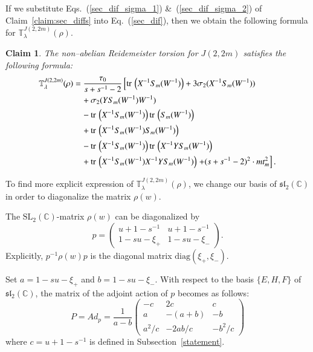 \documentclass[a4paper]{amsart}
\theoremstyle{plain}
\newtheorem{claim}[theorem]{Claim}
\theoremstyle{definition}
\theoremstyle{remark}
\newcommand{\C}{{\mathbb C}}
\newcommand{\CC}{{\mathbb C}}
\newcommand{\SL}{{\mathrm{SL}_2(\C)}}
\newcommand{\sll}{\mathfrak{sl}_2(\CC)}
\newcommand{\trace}{{\rm tr}\,}
\begin{document}
If we substitute Eqs.~(\ref{sec_dif_sigma_1}) \&~(\ref{sec_dif_sigma_2}) of Claim~\ref{claim:sec_diffs}
into Eq.~(\ref{sec_dif}), then we obtain the following formula for ${\mathbb T}^{J(2, 2m)}_{\lambda} (\rho)$.


\begin{claim}\label{torsionJ(2,2m)}
The non--abelian Reidemeister torsion for $J(2, 2m)$ satisfies the following formula:
\begin{align} \label{matrix_rep_torsion_J(2,2m)}
{\mathbb T}^{J(2, 2m)}_{\lambda} (\rho)
&=
\frac{\tau_0}{s+s^{-1}-2}
\left[
    \trace\left(X^{-1}S_m(W^{-1})\right)
    +3\sigma_2(X^{-1}S_m(W^{-1})) \right. \\
    &\quad + \sigma_2(YS_m(W^{-1})W^{-1}) \nonumber \\ 
    &\quad -\trace\left(X^{-1}S_m(W^{-1})\right)\trace\left( S_m(W^{-1})\right) \nonumber \\
    &\quad + \trace\left(X^{-1}S_m(W^{-1})S_m(W^{-1})\right) \nonumber \\
 &\quad- \trace\left(X^{-1}S_m(W^{-1})\right)\trace\left( X^{-1}YS_m(W^{-1}) \right) \nonumber \\
 &\quad + \trace\left(X^{-1}S_m(W^{-1}) X^{-1}YS_m(W^{-1})\right)  
 \left.+ (s+s^{-1} - 2)^2 \cdot mt_m^2 \right]. \nonumber
\end{align}
\end{claim}

To find more explicit expression of ${\mathbb T}^{J(2, 2m)}_{\lambda}(\rho)$,
we change our basis of $\sll$ in order to diagonalize the matrix {$\rho(w)$}.

The $\SL$-matrix $\rho(w)$ can be diagonalized by 
\[
p=
\left(
\begin{array}{cc}
u+1-s^{-1} & u+1-s^{-1} \\
1-su-\xi_{+} & 1-su- \xi_{-}
\end{array}
\right).
\]
Explicitly, $p^{-1} \rho(w) p$ is the diagonal matrix $\mathrm{diag}(\xi_+, \xi_-)$.

Set $a = 1-su-\xi_{+}$ and $b = 1-su-\xi_{-}$.
With respect to the basis $\{E, H, F\}$ of $\sll$, the matrix of the adjoint action of $p$ becomes as follows: 
\[
P = Ad_p = \frac{1}{a-b}
\left(
\begin{array}{ccc}
-c                         & 2c                       & c \\
 a                         & -(a+b)                   & -b \\
 a^2 / c                   & -2ab / c                 & - b^2 / c
\end{array}
\right)
\]
where $c = u+1-s^{-1}$ is defined in Subsection~\ref{statement}.
\end{document}
